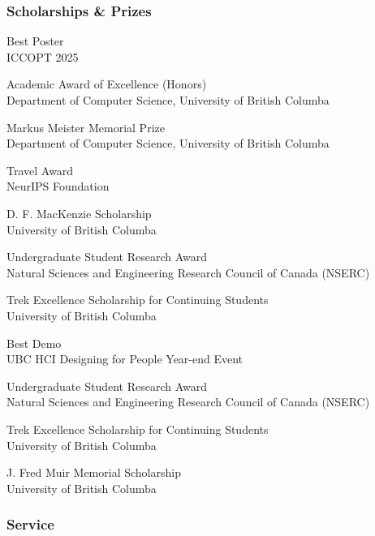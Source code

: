\subsubsection{Scholarships \& Prizes}\nobreak
\begin{description}[leftmargin=\mleftsize,style=nextline,font=\normalfont\space]
    \item[2025] Best Poster\\
          ICCOPT 2025
    \item[2018] Academic Award of Excellence (Honors)\\
          Department of Computer Science, University of British Columba
    \item[2018] Markus Meister Memorial Prize\\
          Department of Computer Science, University of British Columba
    \item[2018] Travel Award\\
          NeurIPS Foundation
    \item[2017] D. F. MacKenzie Scholarship\\
          University of British Columba
    \item[2017] Undergraduate Student Research Award\\
          Natural Sciences and Engineering Research Council of Canada (NSERC)
    \item[2017] Trek Excellence Scholarship for Continuing Students\\
          University of British Columba
    \item[2016] Best Demo\\
          UBC HCI Designing for People Year-end Event
    \item[2016] Undergraduate Student Research Award\\
          Natural Sciences and Engineering Research Council of Canada (NSERC)
    \item[2016] Trek Excellence Scholarship for Continuing Students\\
          University of British Columba
    \item[2016] J. Fred Muir Memorial Scholarship\\
          University of British Columba
\end{description}

\subsubsection{Service} \hfill

